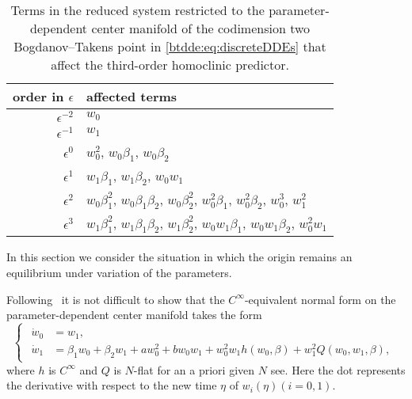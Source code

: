 \begin{table}
\begin{center}
\begingroup
\renewcommand*{\arraystretch}{1.4}
\begin{tabular}{rl}
\hline
order in $\epsilon$ & affected terms \\
\hline%
\(\epsilon^{-2}\) & $w_0$ \\
\(\epsilon^{-1}\) & $w_1$ \\
\(\epsilon^0\)    & $w_0^2$, $w_0 \beta_1$, $w_0 \beta_2$ \\
\(\epsilon^1\)    & $w_1\beta_1$, $w_1\beta_2$, $w_0w_1$ \\
\(\epsilon^2\)    & $w_0\beta_1^{2}$, $w_0\beta_1\beta_2$, $w_0\beta_2^{2}$, $w_0^{2}\beta_1$, $w_0^{2}\beta_2$, $w_0^{3}$, $w_1^{2}$ \\
\(\epsilon^3\)    & $w_1\beta_1^{2}$, $w_1\beta_1\beta_2$, $w_1\beta_2^{2}$, $w_0 w_1\beta_1$, $w_0w_1\beta_2$,  $w_0^{2}w_1$

\\[0.2cm]
\hline
\end{tabular}
\endgroup
\caption{
Terms in the reduced system restricted to the parameter-dependent center manifold of the
codimension two Bogdanov--Takens point in \cref{btdde:eq:discreteDDEs} that affect the third-order homoclinic predictor.} 
\label{btdde:table:terms_affecting_predicor}
\end{center}
\end{table}
%
In this section we consider the situation in which the origin remains an equilibrium
under variation of the parameters.

Following~\cite{Broer1991} it is not difficult to show that the $C^\infty$-equivalent normal form on the parameter-dependent
center manifold takes the form
\begin{equation}
\label{btdde:eq:normal_form_orbital_tbt}
\begin{cases}
\begin{aligned}
    \dot w_0 & =  w_1, \\
    \dot w_1 & =  \beta_1 w_0 + \beta_2 w_1 + aw_0^2 + b w_0 w_1 + w_0^2 w_1 h(w_0,\beta) + w_1^2 Q(w_0,w_1,\beta),
\end{aligned}
\end{cases}
\end{equation}
where $h$ is $C^\infty$ and $Q$ is $N$-flat for an a priori given $N$ see. Here
the dot represents the derivative with respect to the new time $\eta$ of
$w_i(\eta)(i = 0,1)$. 

